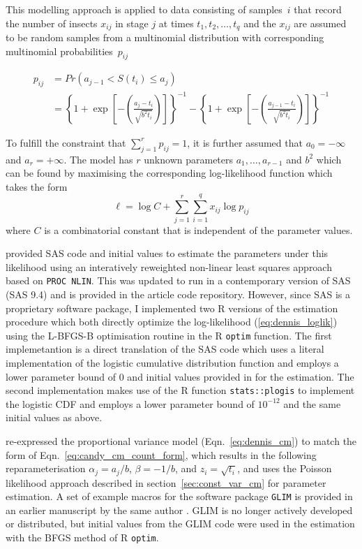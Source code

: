 This modelling approach is applied to data consisting of samples~$i$ that record the number of insects $x_{ij}$ in stage $j$ at times $t_1, t_2, \dots, t_q$ and the $x_{ij}$ are assumed to be random samples from a multinomial distribution with corresponding multinomial probabilities~$p_{ij}$

\begin{align}
p_{ij} & = Pr(a_{j-1} < S(t_i) \leq a_{j})\\
& =  \left\{ 1 + \exp\left[-\left(\frac{a_j-t_i}{\sqrt{b^2t_i}}\right)\right]\right\}^{-1} - \left\{ 1 + \exp\left[-\left(\frac{a_{j-1}-t_i}{\sqrt{b^2t_i}}\right)\right]\right\}^{-1}\label{eq:dennis_cm}
\end{align}

To fulfill the constraint that $\sum_{j=1}^r p_{ij}= 1$, it is further assumed that $a_0 = -\infty$ and $a_r = +\infty$.
The model has $r$ unknown parameters $a_1, \dots, a_{r-1}$ and $b^2$ which can be found by maximising the corresponding log-likelihood function which takes the form 
\begin{equation}
\mathcal{\ell} = \log C + \sum_{j=1}^r \sum_{i=1}^q x_{ij} \log p_{ij}
\label{eq:dennis_loglik}
\end{equation}
where $C$ is a combinatorial constant that is independent of the parameter values.

\citet{dennis1986stochastic} provided SAS code and initial values to estimate the parameters under this likelihood using an interatively reweighted non-linear least squares approach based on \verb+PROC NLIN+. 
This was updated to run in a contemporary version of SAS (SAS 9.4) and is provided in the article code repository. 
However, since SAS is a proprietary software package, I implemented two R versions of the estimation procedure which both directly optimize the log-likelihood (\ref{eq:dennis_loglik}) using the L-BFGS-B optimisation routine \citep{byrd1995limited} in the R \verb+optim+ function. The first implemetantion is a direct translation of the SAS code which uses a literal implementation of the logistic cumulative distribution function and employs a lower parameter bound of 0 and initial values provided in \citep{dennis1986stochastic} for the estimation. The second implementation makes use of the R function \verb+stats::plogis+ to implement the logistic CDF  and employs a lower parameter bound of $10^{-12}$ and the same initial values as above.

\citet{candy1991modeling} re-expressed the proportional variance model (Eqn.~\ref{eq:dennis_cm}) to match the form of Eqn.~\ref{eq:candy_cm_count_form}, which results in the following re\-para\-meter\-isation $\alpha_j = a_j/b$, $\beta = -1/b$, and $z_i = \sqrt{t_i}$, and uses the Poisson likelihood approach described in section~\ref{sec:const_var_cm} for parameter estimation. 
A set of example macros for the software package \verb+GLIM+ \citep{aitkin1989statistical} is provided in an earlier manuscript by the same author \citep{candy1990biology}. GLIM is no longer actively developed or distributed, but initial values from the GLIM code were used in the estimation with the BFGS method of R \verb+optim+.

